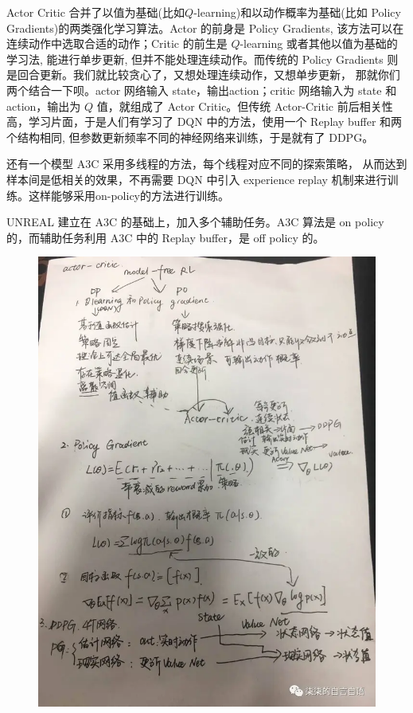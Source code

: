 Actor Critic 合并了以值为基础(比如$Q$-learning)和以动作概率为基础(比如 Policy 
Gradients)的两类强化学习算法。Actor 的前身是 Policy Gradients, 
该方法可以在连续动作中选取合适的动作；Critic 的前生是 $Q$-learning 
或者其他以值为基础的学习法, 能进行单步更新, 但并不能处理连续动作。而传统的 Policy 
Gradients 则是回合更新。我们就比较贪心了，又想处理连续动作，又想单步更新，
那就你们两个结合一下呗。actor 网络输入 state，输出action；critic 网络输入为 state
和 action，输出为 $Q$ 值，就组成了 Actor Critic。但传统 Actor-Critic 
前后相关性高，学习片面，于是人们有学习了 DQN 中的方法，使用一个 Replay buffer 
和两个结构相同, 但参数更新频率不同的神经网络来训练，于是就有了 DDPG。

还有一个模型 A3C 采用多线程的方法，每个线程对应不同的探索策略，
从而达到样本间是低相关的效果，不再需要 DQN 中引入 experience replay 
机制来进行训练。这样能够采用on-policy的方法进行训练。

UNREAL 建立在 A3C 的基础上，加入多个辅助任务。A3C 算法是 on policy 
的，而辅助任务利用 A3C 中的 Replay buffer，是 off policy 的。

\begin{figure}[h]
\centering
\includegraphics[scale=0.118]{pix/td3/1.png}
\end{figure}

